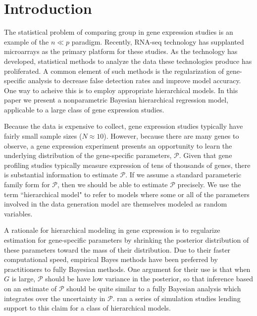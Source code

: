 \section{Introduction}
The statistical problem of comparing group in gene expression studies is an example of the $n \ll p$ paradigm. Recently, RNA-seq technology has supplanted microarrays as the primary platform for these studies. As the technology has developed, statistical methods to analyze the data these technologies produce has proliferated. A common element of such methods is the regularization of gene-specific analysis to decrease false detection rates and improve model accuracy. One way to acheive this is to employ appropriate hierarchical models. In this paper we present a nonparametric Bayesian hierarchical regression model, applicable to a large class of gene expression studies.


Because the data is expensive to collect, gene expression studies typically have fairly small sample sizes ($N \approx 10$). However, because there are many genes to observe, a gene expression experiment presents an opportunity to learn the underlying distribution of the gene-specific parameters, $\mathcal{P}$. Given that gene profiling studies typically measure expression of tens of thousands of genes, there is substantial information to estimate $\mathcal{P}$. If we assume a standard parameteric family form for $\mathcal{P}$, then we should be able to estimate $\mathcal{P}$ precisely. We use the term ``hierarchical model" to refer to models where some or all of the parameters involved in the data generation model are themselves modeled as random variables.

A rationale for hierarchical modeling in gene expression is to regularize estimation for gene-specific parameters by shrinking the posterior distribution of these parameters toward the mass of their distribution. Due to their faster computational speed, empirical Bayes methods have been preferred by practitioners to fully Bayesian methods. One argument for their use is that when $G$ is large, $\mathcal{P}$ should be have low variance in the posterior, so that inference based on an estimate of $\mathcal{P}$ should be quite similar to a fully Bayesian analysis which integrates over the uncertainty in $\mathcal{P}$. \citet{landau2016high} ran a series of simulation studies lending support to this claim for a class of hierarchical models.

